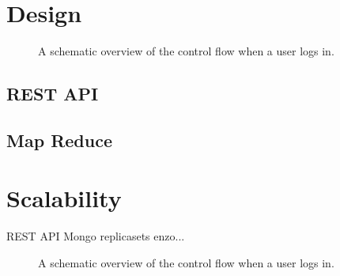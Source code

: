 \section{Design}

\begin{figure}
	\caption{A schematic overview of the control flow when a user logs in.}
	\label{fig:2:overview_backend}
\end{figure}

\subsection{REST API}

\subsection{Map Reduce}

\section{Scalability}
REST API
Mongo replicasets enzo...

\begin{figure}
	\caption{A schematic overview of the control flow when a user logs in.}
	\label{fig:2:replica_set}
\end{figure}
